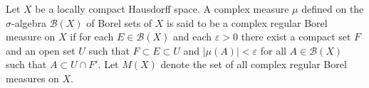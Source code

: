 Let $X$ be a locally compact Hausdorff space. A complex measure $\mu$ defined on the $\sigma$-algebra $\mathcal{B}(X)$ of Borel sets of $X$ is said to be a complex regular Borel measure on $X$ if for each $E \in \mathcal{B}(X)$ and each $\varepsilon > 0$ there exist a compact set $F$ and an open set $U$ such that $F \subset E \subset U$ and $|\mu(A)| < \varepsilon$ for all $A \in \mathcal{B}(X)$ such that $A \subset U \cap F'$. Let $M(X)$ denote the set of all complex regular Borel measures on $X$.
